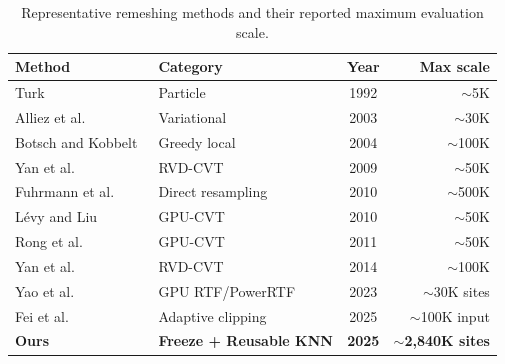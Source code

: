 \begin{table}[t]
\centering
\caption{Representative remeshing methods and their reported maximum evaluation scale.}
\label{tab:related_scale}
\begin{tabular}{llcr}
\hline
\textbf{Method} & \textbf{Category} & \textbf{Year} & \textbf{Max scale} \\
\hline
Turk~\cite{turk1992retiling} & Particle & 1992 & $\sim$5K \\
Alliez et al.~\cite{alliez2003anisotropic} & Variational & 2003 & $\sim$30K \\
Botsch and Kobbelt~\cite{botsch2004remeshing} & Greedy local & 2004 & $\sim$100K \\
Yan et al.~\cite{yan2009rvd} & RVD-CVT & 2009 & $\sim$50K \\
Fuhrmann et al.~\cite{fuhrmann2010direct} & Direct resampling & 2010 & $\sim$500K \\
L\'{e}vy and Liu~\cite{levy2010lp} & GPU-CVT & 2010 & $\sim$50K \\
Rong et al.~\cite{rong2011gpu} & GPU-CVT & 2011 & $\sim$50K \\
Yan et al.~\cite{yan2014clipped} & RVD-CVT & 2014 & $\sim$100K \\
Yao et al.~\cite{yao2023rtf} & GPU RTF/PowerRTF & 2023 & $\sim$30K sites \\
Fei et al.~\cite{fei2025adaptive} & Adaptive clipping & 2025 & $\sim$100K input \\
\textbf{Ours} & \textbf{Freeze + Reusable KNN} & \textbf{2025} & \textbf{$\sim$2{,}840K sites} \\
\hline
\end{tabular}
\end{table}
